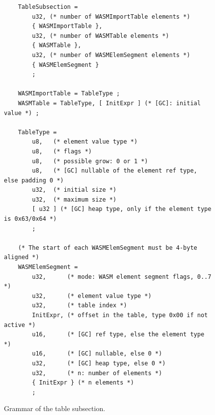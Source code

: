 \documentclass{article}
\begin{document}
\begin{figure}[H]
\begin{verbatim}
    TableSubsection =
        u32, (* number of WASMImportTable elements *)
        { WASMImportTable },
        u32, (* number of WASMTable elements *)
        { WASMTable },
        u32, (* number of WASMElemSegment elements *)
        { WASMElemSegment }
        ;

    WASMImportTable = TableType ;
    WASMTable = TableType, [ InitExpr ] (* [GC]: initial value *) ;

    TableType =
        u8,   (* element value type *)
        u8,   (* flags *)
        u8,   (* possible grow: 0 or 1 *)
        u8,   (* [GC] nullable of the element ref type, else padding 0 *)
        u32,  (* initial size *)
        u32,  (* maximum size *)
        [ u32 ] (* [GC] heap type, only if the element type is 0x63/0x64 *)
        ;

    (* The start of each WASMElemSegment must be 4-byte aligned *)
    WASMElemSegment =
        u32,      (* mode: WASM element segment flags, 0..7 *)
        u32,      (* element value type *)
        u32,      (* table index *)
        InitExpr, (* offset in the table, type 0x00 if not active *)
        u16,      (* [GC] ref type, else the element type *)
        u16,      (* [GC] nullable, else 0 *)
        u32,      (* [GC] heap type, else 0 *)
        u32,      (* n: number of elements *)
        { InitExpr } (* n elements *)
        ;
\end{verbatim}
\caption{Grammar of the table subsection.}
\label{fig:table-subsection-grammar}
\end{figure}
\end{document}
